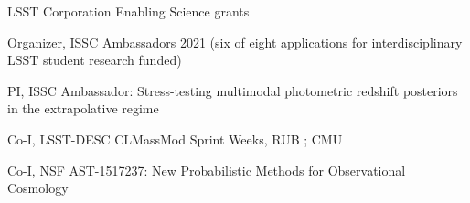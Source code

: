 \documentclass[12pt,letterpaper]{article}
\begin{document}



% 


 \begin{list}{}{\malzlist}
 \item LSST Corporation Enabling Science grants
\begin{list}{}{\malzlist}
	\item Organizer, ISSC Ambassadors 2021 (six of eight applications for interdisciplinary LSST student research funded)
	\item PI, ISSC Ambassador: Stress-testing multimodal photometric redshift posteriors in the extrapolative regime 
	\item Co-I, LSST-DESC CLMassMod Sprint Weeks, RUB ; CMU 
\end{list}
\item Co-I, NSF AST-1517237: New Probabilistic Methods for Observational Cosmology 
\end{list}
\end{document}
